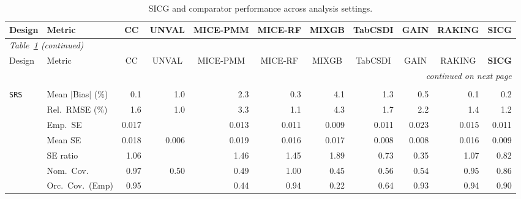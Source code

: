 \begin{landscape}
\footnotesize\setlength{\tabcolsep}{3.5pt}
\begin{longtable}{llrrrrrrrrr}
\caption{SICG and comparator performance across analysis settings.}
\label{tab:appc_vccc_COX} \\
\toprule
Design & Metric & \multicolumn{1}{c}{CC} & \multicolumn{1}{c}{UNVAL} & \multicolumn{1}{c}{MICE-PMM} & \multicolumn{1}{c}{MICE-RF} & \multicolumn{1}{c}{MIXGB} & \multicolumn{1}{c}{TabCSDI} & \multicolumn{1}{c}{GAIN} & \multicolumn{1}{c}{RAKING} & \multicolumn{1}{c}{\textbf{SICG}} \\
\midrule \endfirsthead
\multicolumn{11}{l}{\footnotesize\itshape Table~\ref{tab:appc_vccc_COX} (continued)} \\
\toprule
Design & Metric & \multicolumn{1}{c}{CC} & \multicolumn{1}{c}{UNVAL} & \multicolumn{1}{c}{MICE-PMM} & \multicolumn{1}{c}{MICE-RF} & \multicolumn{1}{c}{MIXGB} & \multicolumn{1}{c}{TabCSDI} & \multicolumn{1}{c}{GAIN} & \multicolumn{1}{c}{RAKING} & \multicolumn{1}{c}{\textbf{SICG}} \\
\midrule \endhead
\midrule \multicolumn{11}{r}{\footnotesize\itshape continued on next page} \\
\endfoot
\bottomrule \endlastfoot
\multicolumn{11}{l}{\textbf{Continuous Phase-Two Covariates}} \\
\addlinespace[2pt]
\quad \texttt{SRS} & Mean $|$Bias$|$ (\%) & \cellcolor{rankone}0.1 & 1.0 & 2.3 & \cellcolor{rankthree}0.3 & 4.1 & 1.3 & 0.5 & \cellcolor{rankone}0.1 & \cellcolor{ranktwo}0.2 \\
 & Rel.\ RMSE (\%) & 1.6 & \cellcolor{rankone}1.0 & 3.3 & \cellcolor{ranktwo}1.1 & 4.3 & 1.7 & 2.2 & 1.4 & \cellcolor{rankthree}1.2 \\
 & Emp.\ SE & 0.017 &  & 0.013 & 0.011 & 0.009 & 0.011 & 0.023 & 0.015 & 0.011 \\
 & Mean SE & 0.018 & 0.006 & 0.019 & 0.016 & 0.017 & 0.008 & 0.008 & 0.016 & 0.009 \\
 & SE ratio & \cellcolor{rankone}1.06 &  & 1.46 & 1.45 & 1.89 & 0.73 & 0.35 & \cellcolor{ranktwo}1.07 & \cellcolor{rankthree}0.82 \\
 & Nom.\ Cov. & \cellcolor{ranktwo}0.97 & 0.50 & 0.49 & \cellcolor{rankthree}1.00 & 0.45 & 0.56 & 0.54 & \cellcolor{rankone}0.95 & 0.86 \\
 & Orc.\ Cov.\ (Emp) & \cellcolor{rankone}0.95 &  & 0.44 & \cellcolor{ranktwo}0.94 & 0.22 & 0.64 & \cellcolor{rankthree}0.93 & \cellcolor{ranktwo}0.94 & 0.90 \\

\end{longtable}
\end{landscape}
